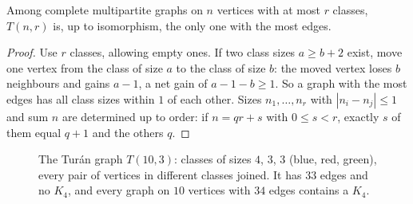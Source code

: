 \begin{lemma}\label{lem:balance}
Among complete multipartite graphs on $n$ vertices with at most $r$ classes, $T(n,r)$ is, up to isomorphism, the only one with the most edges.
\end{lemma}
\begin{proof}
Use $r$ classes, allowing empty ones. If two class sizes $a\ge b+2$ exist, move one vertex from the class of size $a$ to the class of size $b$:
the moved vertex loses $b$ neighbours and gains $a-1$, a net gain of $a-1-b\ge1$. So a graph with the most edges has all class sizes within $1$ of each other.
Sizes $n_1,\dots,n_r$ with $|n_i-n_j|\le1$ and sum $n$ are determined up to order: if $n=qr+s$ with $0\le s<r$, exactly $s$ of them equal $q+1$ and the others $q$.
\end{proof}

\begin{figure}[ht]
\centering
{}
\caption{The Tur\'an graph $T(10,3)$: classes of sizes $4$, $3$, $3$ (blue, red, green), every pair of vertices in different classes joined. It has $33$
edges and no $K_4$, and every graph on $10$ vertices with $34$ edges contains a $K_4$.}
\label{fig:turan}
\end{figure}

